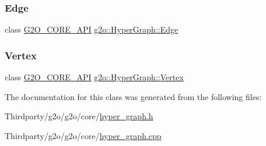 \mbox{\label{classg2o_1_1_hyper_graph_a59ab1fe84b0728a65a0ba15fce9b9cf7}} 
\subsubsection{\texorpdfstring{Edge}{Edge}}
{\footnotesize\ttfamily class \mbox{\hyperlink{g2o__core__api_8h_a7a8d7648d6f1e26632566f335751d064}{G2\+O\+\_\+\+C\+O\+R\+E\+\_\+\+A\+PI}} \mbox{\hyperlink{classg2o_1_1_hyper_graph_1_1_edge}{g2o\+::\+Hyper\+Graph\+::\+Edge}}}

\mbox{\label{classg2o_1_1_hyper_graph_a2aca385a3acb87b4f4365765afd10093}} 
\subsubsection{\texorpdfstring{Vertex}{Vertex}}
{\footnotesize\ttfamily class \mbox{\hyperlink{g2o__core__api_8h_a7a8d7648d6f1e26632566f335751d064}{G2\+O\+\_\+\+C\+O\+R\+E\+\_\+\+A\+PI}} \mbox{\hyperlink{classg2o_1_1_hyper_graph_1_1_vertex}{g2o\+::\+Hyper\+Graph\+::\+Vertex}}}



The documentation for this class was generated from the following files\+:\begin{DoxyCompactItemize}
\item 
Thirdparty/g2o/g2o/core/\mbox{\hyperlink{hyper__graph_8h}{hyper\+\_\+graph.\+h}}\item 
Thirdparty/g2o/g2o/core/\mbox{\hyperlink{hyper__graph_8cpp}{hyper\+\_\+graph.\+cpp}}\end{DoxyCompactItemize}
